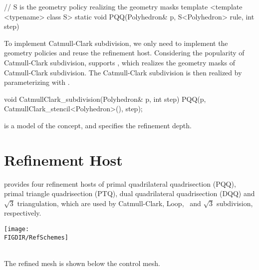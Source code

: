 \begin{ccExampleCode}
  // S is the geometry policy realizing the geometry masks
  template <template <typename> class S>
  static void PQQ(Polyhedron& p, S<Polyhedron> rule, int step)
\end{ccExampleCode}

To implement Catmull-Clark subdivision, we only need to implement
the geometry policies and reuse the  refinement host.
Considering the popularity of Catmull-Clark subdivision,
 supports ,
which realizes the geometry masks of Catmull-Clark subdivision. 
The Catmull-Clark subdivision is then realized by parameterizing 
 with 
.

\begin{ccExampleCode}
  void CatmullClark_subdivision(Polyhedron& p, int step) {
    PQQ(p, CatmullClark_stencil<Polyhedron>(), step);
  }
\end{ccExampleCode}

 is a model of the 
concept, and  specifies the refinement depth.


\section{Refinement Host}
 provides four refinement hosts of primal 
quadrilateral quadrisection (PQQ), primal triangle 
quadrisection (PTQ), dual quadrilateral 
quadrisection (DQQ) and $\sqrt{3}$ triangulation, which 
are used by Catmull-Clark, Loop, \DS\ and $\sqrt{3}$ subdivision, 
respectively. 

\begin{ccTexOnly}
  \begin{center}
    \parbox{0.6\textwidth}{%
      \texttt{[image: \\FIGDIR/RefSchemes]}%
    }\\ \vspace{0.5cm}
    The refined mesh is shown below the control mesh.
  \end{center}
\end{ccTexOnly}



